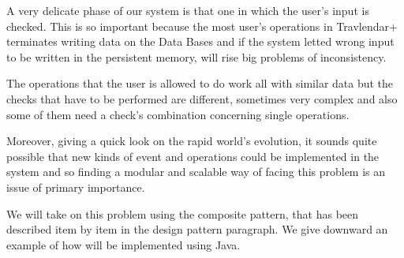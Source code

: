 A very delicate phase of our system is that one in which the user's input is checked. This is so important because the most user’s operations in Travlendar+ terminates writing data on the Data Bases and if the system letted wrong input to be written in the persistent memory, will rise big problems of inconsistency.

The operations that the user is allowed to do work all with similar data but the checks that have to be performed are different, sometimes very complex and also some of them need a check’s combination concerning single operations.

Moreover, giving a quick look on the rapid world’s evolution, it sounds quite possible that new kinds of event and operations could be implemented in the system and so finding a modular and scalable way of facing this problem is an issue of primary importance.

We will take on this problem using the composite pattern, that has been described item by item in the design pattern paragraph. We give downward an example of how will be implemented using Java.



\newpage
{}




\newpage
{}




\newpage
{}
